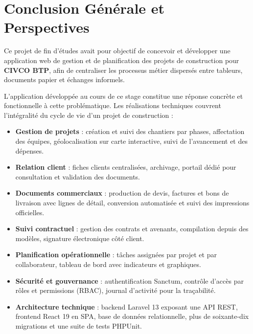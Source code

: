 \chapter*{Conclusion Générale et Perspectives}

Ce projet de fin d'études avait pour objectif de concevoir et développer une
application web de gestion et de planification des projets de construction pour
\textbf{CIVCO BTP}, afin de centraliser les processus métier dispersés entre
tableurs, documents papier et échanges informels.

\medskip

L'application développée au cours de ce stage constitue une réponse concrète et
fonctionnelle à cette problématique. Les réalisations techniques couvrent
l'intégralité du cycle de vie d'un projet de construction :

\begin{itemize}
  \item \textbf{Gestion de projets} : création et suivi des chantiers par phases,
  affectation des équipes, géolocalisation sur carte interactive, suivi de
  l'avancement et des dépenses.
  \item \textbf{Relation client} : fiches clients centralisées, archivage, portail
  dédié pour consultation et validation des documents.
  \item \textbf{Documents commerciaux} : production de devis, factures et bons de
  livraison avec lignes de détail, conversion automatisée et suivi des impressions
  officielles.
  \item \textbf{Suivi contractuel} : gestion des contrats et avenants, compilation
  depuis des modèles, signature électronique côté client.
  \item \textbf{Planification opérationnelle} : tâches assignées par projet et par
  collaborateur, tableau de bord avec indicateurs et graphiques.
  \item \textbf{Sécurité et gouvernance} : authentification Sanctum, contrôle
  d'accès par rôles et permissions (RBAC), journal d'activité pour la traçabilité.
  \item \textbf{Architecture technique} : backend Laravel 13 exposant une API REST,
  frontend React 19 en SPA, base de données relationnelle, plus de soixante-dix
  migrations et une suite de tests PHPUnit.
\end{itemize}

